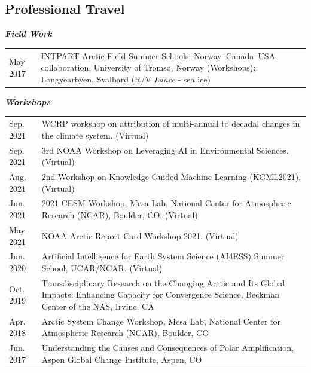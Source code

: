 \documentclass[margin,line,palatino,courier,10pt]{res}
\begin{document}
\begin{resume}
\section{\sc \textcolor{Cerulean}{\large{\textbf{Professional Travel}}}}
\textit{\textbf{Field Work}}
\vspace*{0.05in}\\
\begin{tabular}{@{}p{0.9in}p{4in}}
May 2017 & INTPART Arctic Field Summer Schools: Norway--Canada--USA collaboration, University of Troms\o, Norway (Workshops); Longyearbyen, Svalbard (R/V \textit{Lance} - sea ice)
\end{tabular}

\textit{\textbf{Workshops}}
\vspace*{0.05in}\\
\begin{tabular}{@{}p{0.9in}p{4in}}
Sep. 2021 & WCRP workshop on attribution of multi-annual to decadal changes in the climate system. (Virtual)\\
Sep. 2021 & 3rd NOAA Workshop on Leveraging AI in Environmental Sciences. (Virtual)\\
Aug. 2021 & 2nd Workshop on Knowledge Guided Machine Learning (KGML2021). (Virtual)\\
Jun. 2021 & 2021 CESM Workshop, Mesa Lab, National Center for Atmospheric Research (NCAR), Boulder, CO. (Virtual)\\
May 2021 & NOAA Arctic Report Card Workshop 2021. (Virtual)\\
Jun. 2020 & Artificial Intelligence for Earth System Science (AI4ESS) Summer School, UCAR/NCAR. (Virtual)\\
Oct. 2019 & Transdisciplinary Research on the Changing Arctic and Its Global Impacts:  Enhancing Capacity for Convergence Science, Beckman Center of the NAS, Irvine, CA\\
Apr. 2018 & Arctic System Change Workshop, Mesa Lab, National Center for Atmospheric Research (NCAR), Boulder, CO\\
Jun. 2017 & Understanding the Causes and Consequences of Polar Amplification, Aspen Global Change Institute, Aspen, CO
\end{tabular}

\vspace{-0.1in}
\noindent\textcolor{Cerulean}{\makebox[\linewidth][r]{\rule{\textwidth}{5pt}}}
\vspace{-0.3in}

\end{resume}
\end{document}
